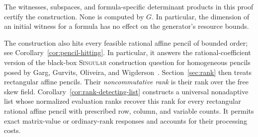 The witnesses, subspaces, and formula-specific determinant products in this proof certify the construction. None is computed by $G$. In particular, the dimension of an initial witness for a formula has no effect on the generator's resource bounds.

The construction also hits every feasible rational affine pencil
of bounded order; see Corollary~\ref{cor:pencil-hitting}.
In particular, it answers the rational-coefficient version of the
black-box \textsc{Singular} construction question for homogeneous
pencils posed by Garg, Gurvits, Oliveira, and
Wigderson~\citep[Section~6, p.~280]{GGOW20}.
Section~\ref{sec:rank} then treats rectangular affine pencils.
Their \emph{noncommutative rank} is their rank over the free skew
field. Corollary~\ref{cor:rank-detecting-list} constructs a universal
nonadaptive list whose normalized evaluation ranks recover this rank
for every rectangular rational affine pencil with prescribed row,
column, and variable counts. It permits exact matrix-value or
ordinary-rank responses and accounts for their processing costs.
